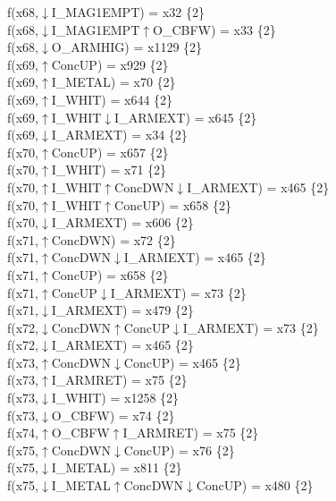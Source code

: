 f(x68,$\downarrow$I\_MAG1EMPT) = x32 \{2\} \\  
f(x68,$\downarrow$I\_MAG1EMPT$\uparrow$O\_CBFW) = x33 \{2\} \\  
f(x68,$\downarrow$O\_ARMHIG) = x1129 \{2\} \\  
f(x69,$\uparrow$ConcUP) = x929 \{2\} \\  
f(x69,$\uparrow$I\_METAL) = x70 \{2\} \\  
f(x69,$\uparrow$I\_WHIT) = x644 \{2\} \\  
f(x69,$\uparrow$I\_WHIT$\downarrow$I\_ARMEXT) = x645 \{2\} \\  
f(x69,$\downarrow$I\_ARMEXT) = x34 \{2\} \\  
f(x70,$\uparrow$ConcUP) = x657 \{2\} \\  
f(x70,$\uparrow$I\_WHIT) = x71 \{2\} \\  
f(x70,$\uparrow$I\_WHIT$\uparrow$ConcDWN$\downarrow$I\_ARMEXT) = x465 \{2\} \\  
f(x70,$\uparrow$I\_WHIT$\uparrow$ConcUP) = x658 \{2\} \\  
f(x70,$\downarrow$I\_ARMEXT) = x606 \{2\} \\  
f(x71,$\uparrow$ConcDWN) = x72 \{2\} \\  
f(x71,$\uparrow$ConcDWN$\downarrow$I\_ARMEXT) = x465 \{2\} \\  
f(x71,$\uparrow$ConcUP) = x658 \{2\} \\  
f(x71,$\uparrow$ConcUP$\downarrow$I\_ARMEXT) = x73 \{2\} \\  
f(x71,$\downarrow$I\_ARMEXT) = x479 \{2\} \\  
f(x72,$\downarrow$ConcDWN$\uparrow$ConcUP$\downarrow$I\_ARMEXT) = x73 \{2\} \\  
f(x72,$\downarrow$I\_ARMEXT) = x465 \{2\} \\  
f(x73,$\uparrow$ConcDWN$\downarrow$ConcUP) = x465 \{2\} \\  
f(x73,$\uparrow$I\_ARMRET) = x75 \{2\} \\  
f(x73,$\downarrow$I\_WHIT) = x1258 \{2\} \\  
f(x73,$\downarrow$O\_CBFW) = x74 \{2\} \\  
f(x74,$\uparrow$O\_CBFW$\uparrow$I\_ARMRET) = x75 \{2\} \\  
f(x75,$\uparrow$ConcDWN$\downarrow$ConcUP) = x76 \{2\} \\  
f(x75,$\downarrow$I\_METAL) = x811 \{2\} \\  
f(x75,$\downarrow$I\_METAL$\uparrow$ConcDWN$\downarrow$ConcUP) = x480 \{2\} \\  
